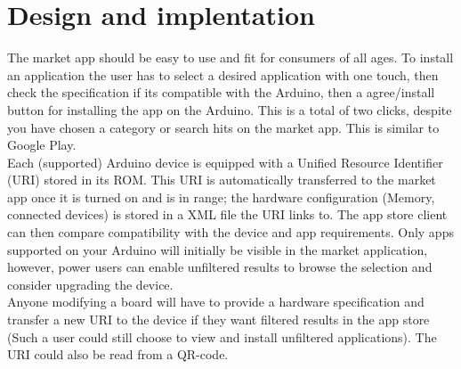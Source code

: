 \section{Design and implentation}
The market app should be easy to use and fit for consumers of all ages. To install an application the user has to select a desired application with one touch, then check the specification if its compatible with the Arduino, then a agree/install button for installing the app on the Arduino. This is a total of two clicks, despite you have chosen a category or search hits on the market app. This is similar to Google Play.\\
\newline
Each (supported) Arduino device is equipped with a Unified Resource Identifier (URI) stored in its ROM. This URI is automatically transferred to the market app once it is turned on and is in range; the hardware configuration (Memory, connected devices) is stored in a XML file the URI links to.
The app store client can then compare compatibility with the device and app requirements.
Only apps supported on your Arduino will initially be visible in the market application, however, power users can enable unfiltered results to browse the selection and consider upgrading the device.\\
\newline
Anyone modifying a board will have to provide a hardware specification and transfer a new URI to the device if they want filtered results in the app store (Such a user could still choose to view and install unfiltered applications).
The URI could also be read from a QR-code.